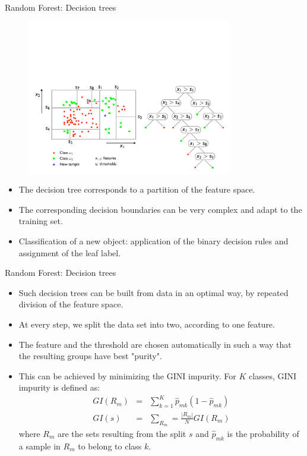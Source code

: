 \documentclass[xcolor=pdftex,dvipsnames,table]{beamer}
\begin{document}
\begin{frame}{Random Forest: Decision trees}
\begin{figure}[htb]
\includegraphics[width=0.8\textwidth]{../graphics/RF2.pdf}
\end{figure}
\begin{itemize}
	\item The decision tree corresponds to a partition of the feature space. 
	\item The corresponding decision boundaries can be very complex and adapt to the training set.
	\item Classification of a new object: application of the binary decision rules and assignment of the leaf label.
\end{itemize}	
\end{frame}

\begin{frame}{Random Forest: Decision trees}
\begin{itemize}
\item Such decision trees can be built from data in an optimal way, by repeated division of the feature space. 
\item At every step, we split the data set into two, according to one feature. 
\item The feature and the threshold are chosen automatically in such a way that the resulting groups have best "purity".
\item This can be achieved by minimizing the GINI impurity. For $K$ classes, GINI impurity is defined as:
\begin{eqnarray*}
GI(R_m) &=& \sum_{k=1}^{K}\hat{p}_{mk}(1-\hat{p}_{mk}) \\
GI(s) &=& \sum_{R_m}=\frac{|R_m|}{N}GI(R_m)
\end{eqnarray*}
where $R_m$ are the sets resulting from the split $s$ and $\hat{p}_{mk}$ is the probability of a sample in $R_m$ to belong to class $k$.
\end{itemize}
\end{frame}
\end{document}
